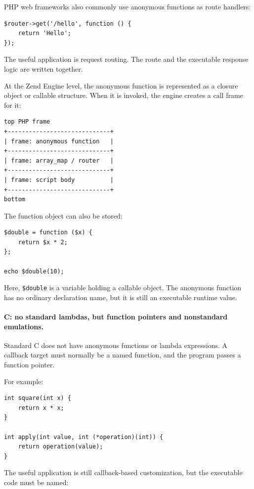 \documentclass[a4paper,twoside]{report}
\begin{document}
PHP web frameworks also commonly use anonymous functions as route handlers:

\begin{verbatim}
$router->get('/hello', function () {
    return 'Hello';
});
\end{verbatim}

The useful application is request routing. The route and the executable response logic are written together.

At the Zend Engine level, the anonymous function is represented as a closure object or callable structure. When it is invoked, the engine creates a call frame for it:

\begin{verbatim}
top PHP frame
+-----------------------------+
| frame: anonymous function   |
+-----------------------------+
| frame: array_map / router   |
+-----------------------------+
| frame: script body          |
+-----------------------------+
bottom
\end{verbatim}

The function object can also be stored:

\begin{verbatim}
$double = function ($x) {
    return $x * 2;
};

echo $double(10);
\end{verbatim}

Here, \texttt{\$double} is a variable holding a callable object. The anonymous function has no ordinary declaration name, but it is still an executable runtime value.

\paragraph{C: no standard lambdas, but function pointers and nonstandard emulations.}

Standard C does not have anonymous functions or lambda expressions. A callback target must normally be a named function, and the program passes a function pointer.

For example:

\begin{verbatim}
int square(int x) {
    return x * x;
}

int apply(int value, int (*operation)(int)) {
    return operation(value);
}
\end{verbatim}

The useful application is still callback-based customization, but the executable code must be named:
\end{document}
